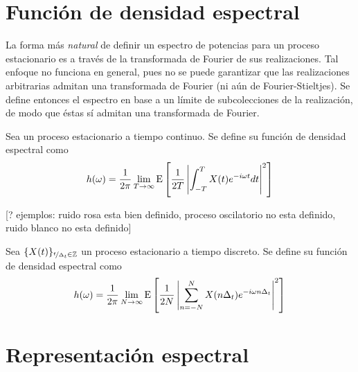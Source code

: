 
\section{Función de densidad espectral}
\label{sec:fde}

La forma más \textit{natural} de definir un espectro de potencias para un proceso estacionario es a través de la transformada de Fourier de sus realizaciones. 
%
Tal enfoque no funciona en general, pues no se puede garantizar que las realizaciones arbitrarias admitan una transformada de Fourier (ni aún de Fourier-Stieltjes).
%
Se define entonces el espectro en base a un límite de subcolecciones de la realización, de modo que éstas sí admitan una transformada de Fourier.

\begin{definicion}
Sea \xt un proceso estacionario a tiempo continuo. Se define su {función de densidad espectral} como
\begin{equation}
h(\omega) = \frac{1}{2 \pi} \lim_{T\rightarrow \infty} \mathrm{E}\left[  \frac{1}{2T} 
\left|  \int_{-T}^{T} X(t) e^{-i \omega t} dt \right|^{2}  \right]
\label{txt_FDE_cont}
\end{equation}
\end{definicion}

[? ejemplos: ruido rosa esta bien definido, proceso oscilatorio no esta definido, ruido blanco no esta definido]

\begin{definicion}
Sea $\{X(t)\}_{\nicefrac{t}{\Delta_t}\in \mathbb{Z}}$ un proceso estacionario a tiempo discreto. Se define su {función de densidad espectral} como
\begin{equation}
h(\omega) = \frac{1}{2 \pi} \lim_{N\rightarrow \infty} \mathrm{E}\left[  \frac{1}{2N} 
\left|  \sum_{n=-N}^{N} X(n \Delta_t) e^{-i \omega n \Delta_t} \right|^{2}  \right]
\label{txt_FDE_disc}
\end{equation}
\end{definicion}


\section{Representación espectral}
\label{sec:representacion}

